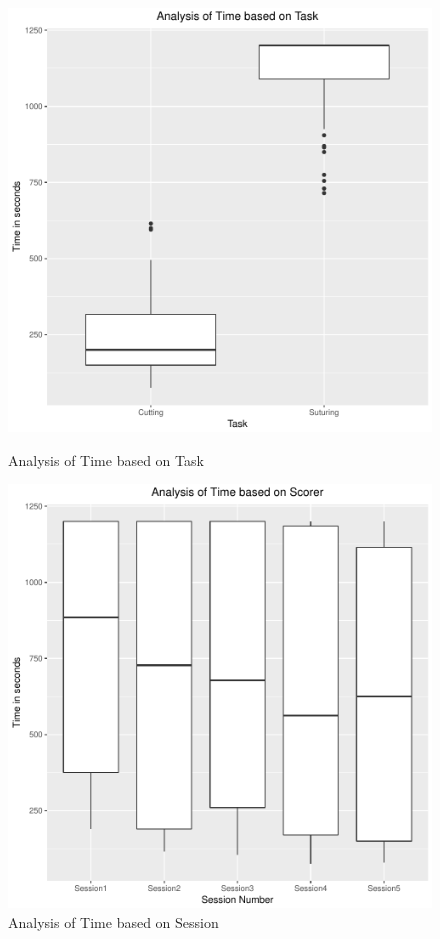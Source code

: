 \documentclass[12pt,epsf]{report}
\begin{document}
\begin{figure}[!htb]
	\begin{minipage}[c]{0.5\linewidth}
	\includegraphics[width=\linewidth]{TaskVsTime.pdf}
	\caption{Analysis of Time based on Task}
	\end{minipage}
	\hfill
	\begin{minipage}[c]{0.5\linewidth}
	\includegraphics[width=\linewidth]{SessionVsTime.pdf}
	\caption{Analysis of Time based on Session}
	\end{minipage}
\end{figure}
\end{document}
